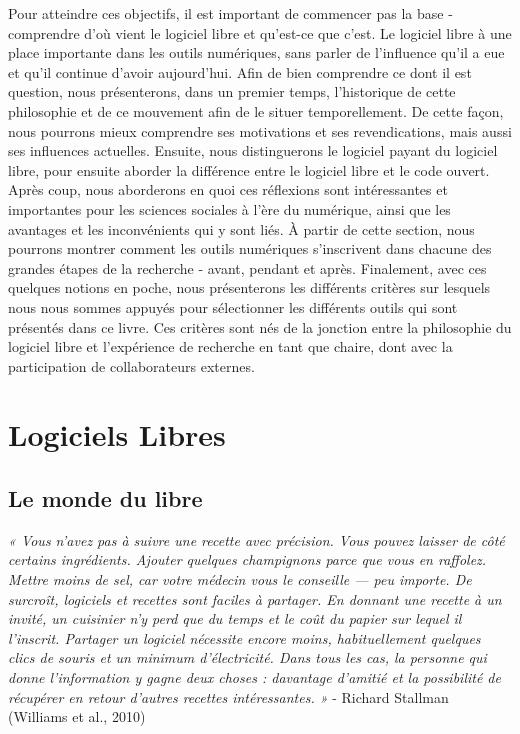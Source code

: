 \documentclass[
  letterpaper,
  DIV=11,
  numbers=noendperiod]{scrreprt}
\begin{document}
Pour atteindre ces objectifs, il est important de commencer pas la base
- comprendre d'où vient le logiciel libre et qu'est-ce que c'est. Le
logiciel libre à une place importante dans les outils numériques, sans
parler de l'influence qu'il a eue et qu'il continue d'avoir aujourd'hui.
Afin de bien comprendre ce dont il est question, nous présenterons, dans
un premier temps, l'historique de cette philosophie et de ce mouvement
afin de le situer temporellement. De cette façon, nous pourrons mieux
comprendre ses motivations et ses revendications, mais aussi ses
influences actuelles. Ensuite, nous distinguerons le logiciel payant du
logiciel libre, pour ensuite aborder la différence entre le logiciel
libre et le code ouvert. Après coup, nous aborderons en quoi ces
réflexions sont intéressantes et importantes pour les sciences sociales
à l'ère du numérique, ainsi que les avantages et les inconvénients qui y
sont liés. À partir de cette section, nous pourrons montrer comment les
outils numériques s'inscrivent dans chacune des grandes étapes de la
recherche - avant, pendant et après. Finalement, avec ces quelques
notions en poche, nous présenterons les différents critères sur lesquels
nous nous sommes appuyés pour sélectionner les différents outils qui
sont présentés dans ce livre. Ces critères sont nés de la jonction entre
la philosophie du logiciel libre et l'expérience de recherche en tant
que chaire, dont avec la participation de collaborateurs externes.

\hypertarget{logiciels-libres}{%
\section{Logiciels Libres}\label{logiciels-libres}}

\hypertarget{le-monde-du-libre}{%
\subsection{Le monde du libre}\label{le-monde-du-libre}}

\emph{« Vous n'avez pas à suivre une recette avec précision. Vous pouvez
laisser de côté certains ingrédients. Ajouter quelques champignons parce
que vous en raffolez. Mettre moins de sel, car votre médecin vous le
conseille --- peu importe. De surcroît, logiciels et recettes sont
faciles à partager. En donnant une recette à un invité, un cuisinier n'y
perd que du temps et le coût du papier sur lequel il l'inscrit. Partager
un logiciel nécessite encore moins, habituellement quelques clics de
souris et un minimum d'électricité. Dans tous les cas, la personne qui
donne l'information y gagne deux choses : davantage d'amitié et la
possibilité de récupérer en retour d'autres recettes intéressantes. »} -
Richard Stallman (Williams et al., 2010)
\end{document}

